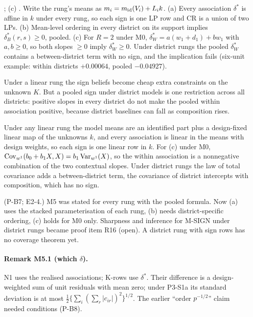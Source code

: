 \begin{result}\label{res:m5}
; (c) . Write the rung's means as
$m_i=m_{\rm id}(V_i)+L_ik$. (a) Every association $\delta^*$ is affine in $k$ under
every rung, so each sign is one LP row and CR is a union of two LPs. (b) Mean-level
ordering in every district on its support implies $\delta^*_B(r,s)\ge0$, pooled.
(c) For $R=2$ under M0, $\delta^*_W=a(w_1+d_1)+bw_1$ with $a,b\ge0$, so both
slopes $\ge0$ imply $\delta^*_W\ge0$. Under district rungs the pooled
$\delta^*_W$ contains a between-district term with no sign, and the implication
fails (six-unit example: within districts $+0.00064$, pooled $-0.04927$).
\end{result}
\begin{plain}
Under a linear rung the sign beliefs become cheap extra constraints on the
unknown $K$. But a pooled sign under district models is one restriction across
all districts: positive slopes in every district do not make the pooled within
association positive, because district baselines can fall as composition rises.
\end{plain}
\begin{sketch}
Under any linear rung the model means are an identified part plus a design-fixed
linear map of the unknowns $k$, and every association is linear in the means
with design weights, so each sign is one linear row in $k$. For (c) under M0,
$\operatorname{Cov}_{w^1}(b_0+b_1X,X)=b_1\operatorname{Var}_{w^1}(X)$, so the within association is a
nonnegative combination of the two contextual slopes. Under district rungs the
law of total covariance adds a between-district term, the covariance of district
intercepts with composition, which has no sign.
\end{sketch}
\begin{revnote}
(P-B7; E2-4.) M5 was stated for every rung with the pooled formula. Now (a) uses
the stacked parameterisation of each rung, (b) needs district-specific ordering,
(c) holds for M0 only. Sharpness and inference for M-SIGN under district rungs
became proof item R16 (open). A district rung with sign rows has no coverage
theorem yet.
\end{revnote}

\paragraph{Remark M5.1 (which $\delta$).} N1 uses the realised associations;
K-rows use $\delta^*$. Their difference is a design-weighted sum of unit residuals
with mean zero; under P3-S1a its standard deviation is at most
$\tfrac12\{\sum_i(\sum_r|c_{ir}|)^2\}^{1/2}$. The earlier ``order $p^{-1/2}$''
claim needed conditions (P-B8).

